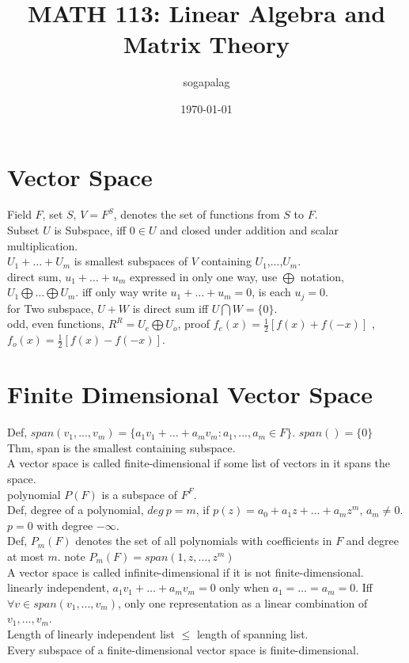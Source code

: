 \documentclass[paper=a4, fontsize=11pt]{scrartcl} %
\title{MATH 113: Linear Algebra and Matrix Theory}
\author{sogapalag}
\date{\normalsize\today}
\numberwithin{equation}{section} %
\numberwithin{figure}{section} %
\numberwithin{table}{section} %
\begin{document}
\maketitle 
\section{Vector Space}
Field $F$, set $S$, $V=F^{S}$, denotes the set of functions from $S$ to $F$.\\
Subset $U$ is Subspace, iff $0\in U$ and closed under addition and scalar multiplication.\\
$U_1 + \dots + U_m$ is smallest subspaces of $V$  containing $U_1$,...,$U_m$.\\
direct sum, $u_1 + \dots + u_m$ expressed in only one way, use $\bigoplus$ notation, $U_1 \bigoplus \dots \bigoplus U_m$. iff only way write $u_1 + \dots + u_m = 0$, is each $u_j = 0$.\\
for Two subspace, $U+W$ is direct sum iff $U\bigcap W = \{0\}$.\\
odd, even functions, $R^R = U_e \bigoplus U_o$, proof $f_e(x) = \frac{1}{2} [f(x) +  f(-x)]$ , $f_o(x) = \frac{1}{2} [f(x) -  f(-x)]$.


\section{Finite Dimensional Vector Space}
Def, $span(v_1,...,v_m) = \{a_1v_1+\dots +a_mv_m: a_1,...,a_m\in F\}$. $span() = \{0\}$\\
Thm, span is the smallest containing subspace.\\
A vector space is called finite-dimensional if some list of vectors in it spans the space.\\
polynomial $P(F)$ is a subspace of $F^F$.\\
Def, degree of a polynomial, $deg\ p = m$, if $p(z)=a_0+a_1z+\dots+ a_mz^m$, $a_m\neq 0$. $p = 0$ with degree $-\infty$.\\
Def, $P_m(F)$ denotes the set of all polynomials with coefficients in $F$ and degree at most $m$. note $P_m(F)=span(1,z,...,z^m)$\\
A vector space is called infinite-dimensional if it is not finite-dimensional.\\
linearly independent, $a_1v_1+\dots+a_mv_m = 0$ only when $a_1=\dots=a_m=0$. Iff $\forall v\in span(v_1,...,v_m)$, only one representation as a linear combination of $v_1,...,v_m$.\\
Length of linearly independent list $\leq$ length of spanning list.\\
Every subspace of a finite-dimensional vector space is finite-dimensional.
\end{document}
